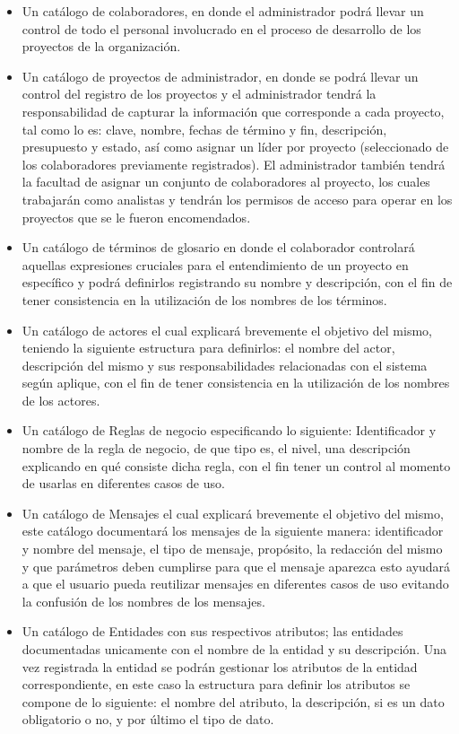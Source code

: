 \begin{itemize}
	\item Un catálogo de colaboradores, en donde el administrador podrá llevar un control de todo el personal involucrado en el proceso de desarrollo de los proyectos de la organización.
	\item Un catálogo de proyectos de administrador, en donde se podrá llevar un control del registro de los proyectos y el administrador tendrá la responsabilidad de capturar la información que corresponde a cada proyecto, tal como lo es: clave, nombre, fechas de término y fin, descripción, presupuesto y estado, así como asignar un líder por proyecto (seleccionado de los colaboradores previamente registrados).
	El administrador también tendrá la facultad de asignar un conjunto de colaboradores al proyecto, los cuales trabajarán como analistas y tendrán los permisos de acceso para operar en los proyectos que se le fueron encomendados.
	\item Un catálogo de términos de glosario en donde el colaborador controlará aquellas expresiones cruciales para el entendimiento de un proyecto en específico y podrá definirlos registrando su nombre y descripción, con el fin de tener consistencia en la utilización de los nombres de los términos.
	\item Un catálogo de actores el cual explicará brevemente el objetivo del mismo, teniendo la siguiente estructura para definirlos: el nombre del actor, descripción del mismo y sus responsabilidades relacionadas con el sistema según aplique, con el fin de tener consistencia en la utilización de los nombres de los actores.
	\item Un catálogo de Reglas de negocio especificando lo siguiente: Identificador y nombre de la regla de negocio, de que tipo es, el nivel, una descripción explicando en qué consiste dicha regla, con el fin tener un control al momento de usarlas en diferentes casos de uso.
	\item Un catálogo de Mensajes el cual explicará brevemente el objetivo del mismo, este catálogo documentará los mensajes de la siguiente manera: identificador y nombre del mensaje, el tipo de mensaje, propósito, la redacción del mismo y que parámetros deben cumplirse para que el mensaje aparezca esto ayudará a que el usuario pueda reutilizar mensajes en diferentes casos de uso evitando la confusión de los nombres de los mensajes.
	\item Un catálogo de Entidades con sus respectivos atributos; las entidades documentadas unicamente con el nombre de la entidad y su descripción. Una vez registrada la entidad se podrán gestionar los atributos de la entidad correspondiente, en este caso la estructura para definir los atributos se compone de lo siguiente: el nombre del atributo, la descripción, si es un dato obligatorio o no, y por último el tipo de dato.

\end{itemize}
